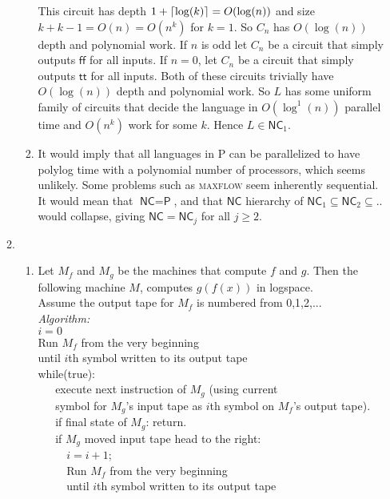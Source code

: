 \documentclass[a4paper, draft, 12pt]{article}
\begin{document}
\begin{enumerate}
\begin{enumerate}
\begin{enumerate}
  This circuit has depth $1 + \lceil\log(k)\rceil = O(\log(n))$ and size $k + k - 1 = O(n) = O(n^k)$ for $k=1$.
  So $C_n$ has $O(\log(n))$ depth and polynomial work.
  If $n$ is odd let $C_n$ be a circuit that simply outputs $\textsf{ff}$ for all inputs. 
  If $n = 0$, let $C_n$ be a circuit that simply outputs $\textsf{tt}$ for all inputs.
  Both of these circuits trivially have $O(\log(n))$ depth and polynomial work.
  So $L$ has some uniform family of circuits that 
  decide the language in $O(\log^1(n))$ parallel time and $O(n^k)$ work for some $k$.
  Hence $L \in \textsf{NC}_1$. 
  \item %
  It would imply that all languages in \textsf{P} can be parallelized to have polylog time 
  with a polynomial number of processors, which seems unlikely. 
  Some problems such as \textsc{maxflow} seem inherently sequential. It 
  would mean that $\textsf{NC} = \textsf{P}$, and that $\textsf{NC}$ hierarchy
  of $\textsf{NC}_1 \subseteq \textsf{NC}_2 \subseteq .. $ would collapse, giving 
  $\textsf{NC} = \textsf{NC}_j$ for all $j \geqslant 2$. 
  \end{enumerate}
  \item %
  \begin{enumerate}
  \item %
  Let $M_f$ and $M_g$ be the machines that compute $f$ and $g$. 
  Then the following machine $M$, computes $g(f(x))$ in logspace.\\
  Assume the output tape for $M_f$ is numbered from 0,1,2,...\\
  \textit{Algorithm:}\\
  $i = 0$ \\
  Run $M_f$ from the very beginning   \\
  until $i$th symbol written to its output tape \\
  while(true): \\
  $~\quad$ execute next instruction of $M_g$ (using current \\
  $~\quad$ symbol for $M_g$'s input tape as $i$th symbol on $M_f$'s output tape). \\
  $~\quad$ if final state of $M_g$: return. \\
  $~\quad$ if $M_g$ moved input tape head to the right: \\
  $~\quad\quad$ $i = i + 1$; \\
  $~\quad\quad$ Run $M_f$ from the very beginning   \\
  $~\quad\quad$ until $i$th symbol written to its output tape \\

\end{enumerate}
\end{enumerate}
\end{enumerate}
\end{document}
